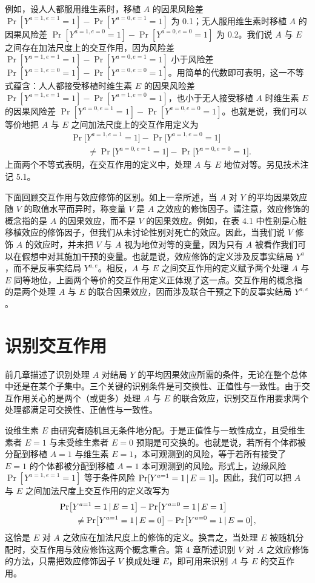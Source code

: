 例如，设人人都服用维生素时，移植 $A$ 的因果风险差 $\Pr[Y^{a=1,e=1}=1]-\Pr[Y^{a=0,e=1}=1]$ 为 0.1；无人服用维生素时移植 $A$ 的因果风险差 $\Pr[Y^{a=1,e=0}=1]-\Pr[Y^{a=0,e=0}=1]$ 为 0.2。我们说 $A$ 与 $E$ 之间存在加法尺度上的交互作用，因为风险差 $\Pr[Y^{a=1,e=1}=1]-\Pr[Y^{a=0,e=1}=1]$ 小于风险差 $\Pr[Y^{a=1,e=0}=1]-\Pr[Y^{a=0,e=0}=1]$。用简单的代数即可表明，这一不等式蕴含：人人都接受移植时维生素 $E$ 的因果风险差 $\Pr[Y^{a=1,e=1}=1]-\Pr[Y^{a=1,e=0}=1]$，也小于无人接受移植 $A$ 时维生素 $E$ 的因果风险差 $\Pr[Y^{a=0,e=1}=1]-\Pr[Y^{a=0,e=0}=1]$。也就是说，我们可以等价地把 $A$ 与 $E$ 之间加法尺度上的交互作用定义为
\[
\begin{aligned}
&\Pr\bigl[Y^{a=1,e=1}=1\bigr]-\Pr\bigl[Y^{a=1,e=0}=1\bigr]\\
&\qquad\neq \Pr\bigl[Y^{a=0,e=1}=1\bigr]-\Pr\bigl[Y^{a=0,e=0}=1\bigr].
\end{aligned}
\]
上面两个不等式表明，在交互作用的定义中，处理 $A$ 与 $E$ 地位对等。另见技术注记 5.1。

下面回顾交互作用与效应修饰的区别。如上一章所述，当 $A$ 对 $Y$ 的平均因果效应随 $V$ 的取值水平而异时，称变量 $V$ 是 $A$ 之效应的修饰因子。请注意，效应修饰的概念指的是 $A$ 的因果效应，而不是 $V$ 的因果效应。例如，在表 4.1 中性别是心脏移植效应的修饰因子，但我们从未讨论性别对死亡的效应。因此，当我们说 $V$ 修饰 $A$ 的效应时，并未把 $V$ 与 $A$ 视为地位对等的变量，因为只有 $A$ 被看作我们可以在假想中对其施加干预的变量。也就是说，效应修饰的定义涉及反事实结局 $Y^{a}$，而不是反事实结局 $Y^{a,e}$。相反，$A$ 与 $E$ 之间交互作用的定义赋予两个处理 $A$ 与 $E$ 同等地位，上面两个等价的交互作用定义正体现了这一点。交互作用的概念指的是两个处理 $A$ 与 $E$ 的联合因果效应，因而涉及联合干预之下的反事实结局 $Y^{a,e}$。

\section{识别交互作用}

前几章描述了识别处理 $A$ 对结局 $Y$ 的平均因果效应所需的条件，无论在整个总体中还是在某个子集中。三个关键的识别条件是可交换性、正值性与一致性。由于交互作用关心的是两个（或更多）处理 $A$ 与 $E$ 的联合效应，识别交互作用要求两个处理都满足可交换性、正值性与一致性。

设维生素 $E$ 由研究者随机且无条件地分配。于是正值性与一致性成立，且受维生素者 $E=1$ 与未受维生素者 $E=0$ 预期是可交换的。也就是说，若所有个体都被分配到移植 $A=1$ 与维生素 $E=1$，本可观测到的风险，等于若所有接受了 $E=1$ 的个体都被分配到移植 $A=1$ 本可观测到的风险。形式上，边缘风险 $\Pr[Y^{a=1,e=1}=1]$ 等于条件风险 $\Pr[Y^{a=1}=1\,|\, E=1]$。因此，我们可以把 $A$ 与 $E$ 之间加法尺度上交互作用的定义改写为
\[
\begin{aligned}
&\Pr\bigl[Y^{a=1}=1\,|\, E=1\bigr]-\Pr\bigl[Y^{a=0}=1\,|\, E=1\bigr]\\
&\qquad\neq \Pr\bigl[Y^{a=1}=1\,|\, E=0\bigr]-\Pr\bigl[Y^{a=0}=1\,|\, E=0\bigr],
\end{aligned}
\]
这恰是 $E$ 对 $A$ 之效应在加法尺度上的修饰的定义。换言之，当处理 $E$ 被随机分配时，交互作用与效应修饰这两个概念重合。第 4 章所述识别 $V$ 对 $A$ 之效应修饰的方法，只需把效应修饰因子 $V$ 换成处理 $E$，即可用来识别 $A$ 与 $E$ 的交互作用。

